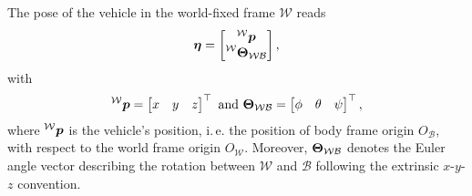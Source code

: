 The pose of the vehicle in the world-fixed frame $\mathcal{W}$ reads
\begin{equation}
	\etab = 
	\begin{bmatrix}
		\prescript{\mathcal{W}}{}{\pbo} \\
		\prescript{\mathcal{W}}{}{\Theb_{\mathcal{W}\mathcal{B}}}
	\end{bmatrix}
	,
\end{equation}
with
\begin{equation}
	\prescript{\mathcal{W}}{}{\mbox{$\bm{p}$}} = 
	\begin{bmatrix}
		x & y & z
	\end{bmatrix}^\top
	\text{ and }
	\mbox{$\bm{\Theta}$}_{\mathcal{W}\mathcal{B}} =
	\begin{bmatrix}
		\phi & \theta & \psi
	\end{bmatrix}^\top,
\end{equation}
where $\prescript{\mathcal{W}}{}{\mbox{$\bm{p}$}}$ is the vehicle's position, i.\,e. the position of body frame origin $O_\mathcal{B}$, with respect to the world frame origin $O_\mathcal{W}$.
Moreover, $\mbox{$\bm{\Theta}$}_{\mathcal{W}\mathcal{B}}$ denotes the Euler angle vector describing the rotation between $\mathcal{W}$ and $\mathcal{B}$ following the extrinsic $x$-$y$-$z$ convention.

